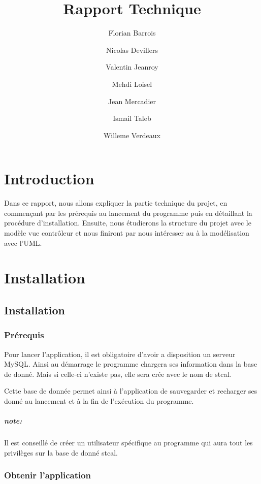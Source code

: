 \documentclass[a4paper,10pt]{report}
\title{Rapport Technique}
\author{Florian Barrois \and Nicolas Devillers \and Valentin Jeanroy \and Mehdi Loisel \and Jean Mercadier \and Ismail Taleb \and Willeme Verdeaux}
\begin{document}
\thispagestyle{headings}

\maketitle

\tableofcontents

\chapter*{Introduction}

Dans ce rapport, nous allons expliquer la partie technique du projet, en commençant par les prérequis au lancement du programme puis en détaillant la procédure d'installation. Ensuite, nous étudierons la structure du projet avec le modèle vue contrôleur et nous finiront par nous intéresser au à la modélisation avec l'UML.

\chapter{Installation}

	\section{Installation}

		\subsection{Prérequis}

			Pour lancer l'application, il est obligatoire d'avoir a disposition un serveur MySQL. Ainsi au démarrage le programme chargera ses information dans la base de donné. Mais si celle-ci n'existe pas, elle sera crée avec le nom de stcal.

			Cette base de donnée permet ainsi à l'application de sauvegarder et recharger ses donné au lancement et à la fin de l’exécution du programme.

			\paragraph*{note:}
			Il est conseillé de créer un utilisateur spécifique au programme qui aura tout les privilèges sur la base de donné stcal.

		\subsection{Obtenir l'application}
\end{document}
